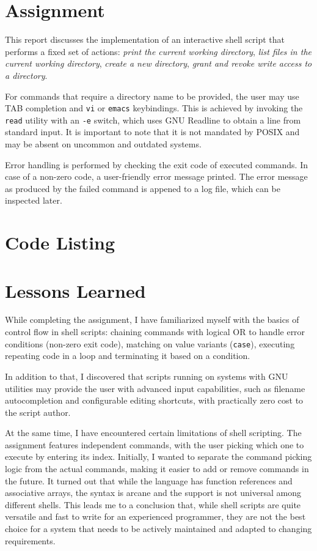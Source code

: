 \documentclass[en, listings]{labreport}
\begin{document}
\maketitlepage

\section*{Assignment}

This report discusses the implementation of an interactive shell script that
performs a fixed set of actions: \textit{print the current working directory},
\textit{list files in the current working directory}, \textit{create a new directory},
\textit{grant and revoke write access to a directory}.

For commands that require a directory name to be provided, the user may use
TAB completion and \texttt{vi} or \texttt{emacs} keybindings. This is achieved by invoking
the \texttt{read} utility with an \verb|-e| switch, which uses GNU Readline to obtain a line
from standard input. It is important to note that it is not mandated by POSIX and may be
absent on uncommon and outdated systems.

Error handling is performed by checking the exit code of executed commands.
In case of a non-zero code, a user-friendly error message printed. The error message
as produced by the failed command is appened to a log file, which can be inspected later.

\section*{Code Listing}



\section*{Lessons Learned}

While completing the assignment, I have familiarized myself with
the basics of control flow in shell scripts: chaining commands
with logical OR to handle error conditions (non-zero exit code),
matching on value variants (\texttt{case}), executing repeating code
in a loop and terminating it based on a condition.

In addition to that, I discovered that scripts running on systems
with GNU utilities may provide the user with advanced input capabilities,
such as filename autocompletion and configurable editing shortcuts,
with practically zero cost to the script author.

At the same time, I have encountered certain limitations of shell scripting.
The assignment features independent commands, with the user picking which one to
execute by entering its index. Initially, I wanted to separate the command picking
logic from the actual commands, making it easier to add or remove commands in the future.
It turned out that while the language has function references and associative arrays,
the syntax is arcane and the support is not universal among different shells.
This leads me to a conclusion that, while shell scripts are quite versatile and
fast to write for an experienced programmer, they are not the best choice
for a system that needs to be actively maintained and adapted to changing requirements.
\end{document}
